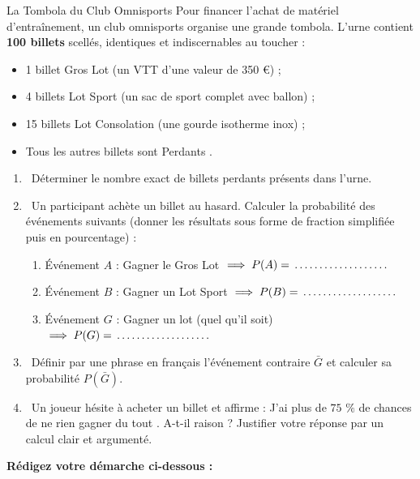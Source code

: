 \begin{sujetdnb}{La Tombola du Club Omnisports}
Pour financer l'achat de matériel d'entraînement, un club omnisports organise une grande tombola. L'urne contient \textbf{100 billets} scellés, identiques et indiscernables au toucher :
\begin{itemize}[leftmargin=1.5em, itemsep=1pt]
    \item 1 billet \og Gros Lot \fg{} (un VTT d'une valeur de 350 \euro{}) ;
    \item 4 billets \og Lot Sport \fg{} (un sac de sport complet avec ballon) ;
    \item 15 billets \og Lot Consolation \fg{} (une gourde isotherme inox) ;
    \item Tous les autres billets sont \og Perdants \fg{}.
\end{itemize}

\begin{enumerate}[leftmargin=1.5em, itemsep=3pt]
    \item \capSApproprier\ Déterminer le nombre exact de billets perdants présents dans l'urne. \pointille[3cm]
    \item \capRealiser\ Un participant achète un billet au hasard. Calculer la probabilité des événements suivants (donner les résultats sous forme de fraction simplifiée puis en pourcentage) :
    \begin{enumerate}[label=\alph*), leftmargin=1.5em, itemsep=2pt]
        \item Événement $A$ : \og Gagner le Gros Lot \fg{} $\implies P(A) = \pointille[3cm]$
        \item Événement $B$ : \og Gagner un Lot Sport \fg{} $\implies P(B) = \pointille[3cm]$
        \item Événement $G$ : \og Gagner un lot (quel qu'il soit) \fg{} $\implies P(G) = \pointille[3cm]$
    \end{enumerate}
    \item \capAnalyser\ Définir par une phrase en français l'événement contraire $\bar{G}$ et calculer sa probabilité $P(\bar{G})$.
    \item \capValider\ Un joueur hésite à acheter un billet et affirme : \og J'ai plus de $75\text{ \%}$ de chances de ne rien gagner du tout \fg{}. A-t-il raison ? Justifier votre réponse par un calcul clair et argumenté.
\end{enumerate}

\vspace{2mm}
\noindent\textbf{Rédigez votre démarche ci-dessous :}
\lignesreponse[8]
\end{sujetdnb}
